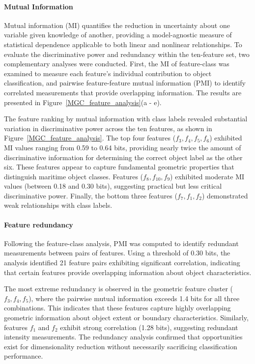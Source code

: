 \documentclass{erauthesis}
\begin{document}
\paragraph{Mutual Information}
Mutual information (MI) quantifies the reduction in uncertainty about one variable given knowledge of another, providing a model-agnostic measure of statistical dependence applicable to both linear and nonlinear relationships. 
To evaluate the discriminative power and redundancy within the ten-feature set, two complementary analyses were conducted.
First, the MI of feature-class was examined to measure each feature's individual contribution to object classification, and pairwise feature-feature mutual information (PMI) to identify correlated measurements that provide overlapping information.
The results are presented in Figure~\ref{MGC_feature_analysis}(a - e).

The feature ranking by mutual information with class labels revealed substantial variation in discriminative power across the ten features, as shown in Figure~\ref{MGC_feature_analysis}. 
The top four features ($f_3, f_4, f_5, f_6$) exhibited MI values ranging from 0.59 to 0.64 bits, providing nearly twice the amount of discriminative information for determining the correct object label as the other six.
These features appear to capture fundamental geometric properties that distinguish maritime object classes. 
Features ($f_8, f_{10}, f_9$) exhibited moderate MI values (between 0.18 and 0.30 bits), suggesting practical but less critical discriminative power. 
Finally, the bottom three features ($f_7, f_1, f_2$) demonstrated weak relationships with class labels. %

\paragraph{Feature redundancy}
Following the feature-class analysis, PMI was computed to identify redundant measurements between pairs of features.
Using a threshold of 0.30 bits, the analysis identified 21 feature pairs exhibiting significant correlation, indicating that certain features provide overlapping information about object characteristics. 

The most extreme redundancy is observed in the geometric feature cluster ($f_3, f_4, f_5$), where the pairwise mutual information exceeds 1.4 bits for all three combinations. 
This indicates that these features capture highly overlapping geometric information about object extent or boundary characteristics. 
Similarly, features $f_1$ and $f_2$ exhibit strong correlation (1.28 bits), suggesting redundant intensity measurements. 
The redundancy analysis confirmed that opportunities exist for dimensionality reduction without necessarily sacrificing classification performance.
\end{document}
